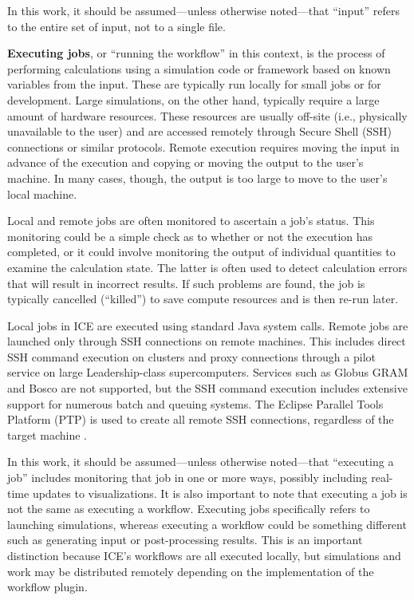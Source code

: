 In this work, it should be assumed---unless otherwise noted---that
``input'' refers to the entire set of input, not to a single file.

\textbf{Executing jobs}, or ``running the workflow'' in this context, is
the process of performing calculations using a simulation code or
framework based on known variables from the input. These are typically run locally for small jobs or for development. Large
simulations, on the other hand, typically require a large amount of
hardware resources. These resources are usually off-site (i.e.,
physically unavailable to the user) and are accessed remotely
through Secure Shell (SSH) connections or similar protocols. Remote
execution requires moving the input in advance of the execution and
copying or moving the output to the user's machine. In many cases,
though, the output is too large to move to the user's local machine.

Local and remote jobs are often monitored to ascertain a job's status.
This monitoring could be a simple check as to whether or not the execution
has completed, or it could involve monitoring the output of individual
quantities to examine the calculation state. The latter is often used to
detect calculation errors that will result in incorrect results. If such
problems are found, the job is typically cancelled (``killed'') to save
compute resources and is then re-run later.

Local jobs in ICE are executed using standard Java system calls. Remote jobs are launched only through SSH connections on remote machines. This includes direct SSH command execution on clusters and proxy connections through a pilot service on large Leadership-class supercomputers. Services such as Globus GRAM and Bosco are not supported, but the SSH command execution includes extensive support for numerous batch and queuing systems. The Eclipse Parallel Tools Platform (PTP) is used to create all remote SSH connections, regardless of the target machine \cite{tibbitts_integrated_2009}.

In this work, it should be assumed---unless otherwise noted---that
``executing a job'' includes monitoring that job in one or more ways,
possibly including real-time updates to visualizations. It is also important to note that executing a job is not the same as executing a workflow. Executing jobs specifically refers to launching simulations, whereas executing a workflow could be something different such as generating input or post-processing results. This is an important distinction because ICE's workflows are all executed locally, but simulations and work may be distributed remotely depending on the implementation of the workflow plugin.

